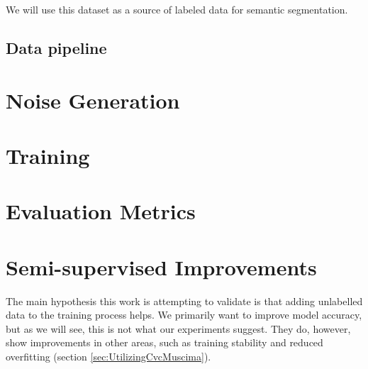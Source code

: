 We will use this dataset as a source of labeled data for semantic segmentation.


\subsection{Data pipeline}



\section{Noise Generation}
\label{sec:NoiseGeneration}



\section{Training}
\label{sec:Training}



\section{Evaluation Metrics}
\label{sec:EvaluationMetrics}




\section{Semi-supervised Improvements}
\label{sec:SemisupervisedImprovements}

The main hypothesis this work is attempting to validate is that adding unlabelled data to the training process helps. We primarily want to improve model accuracy, but as we will see, this is not what our experiments suggest. They do, however, show improvements in other areas, such as training stability and reduced overfitting (section \ref{sec:UtilizingCvcMuscima}).

